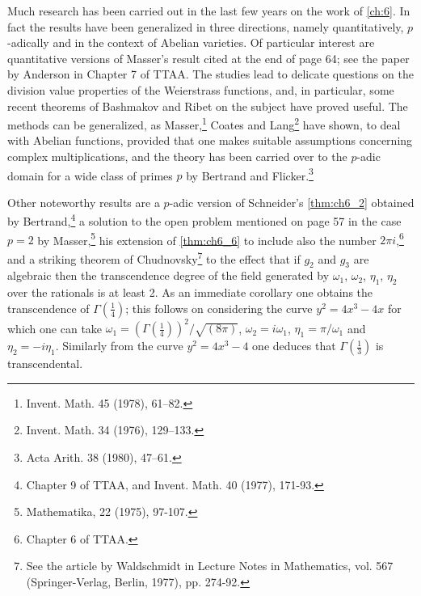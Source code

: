 Much research has been carried out in the last few years on the work of \autoref{ch:6}. In fact the results have been generalized in three directions, namely quantitatively, \(p\)-adically and in the context of Abelian varieties. Of particular interest are quantitative versions of Masser's result cited at the end of page 64; see the paper by Anderson in Chapter 7 of TTAA. The studies lead to delicate questions on the division value properties of the Weierstrass functions, and, in particular, some recent theorems of Bashmakov and Ribet on the subject have proved useful. The methods can be generalized, as Masser,\footnote{Invent. Math. 45 (1978), 61--82.} Coates and Lang\footnote{Invent. Math. 34 (1976), 129--133.} have shown, to deal with Abelian functions, provided that one makes suitable assumptions concerning complex multiplications, and the theory has been carried over to the \(p\)-adic domain for a wide class of primes \(p\) by Bertrand and Flicker.\footnote{Acta Arith. 38 (1980), 47--61.}

Other noteworthy results are a \(p\)-adic version of Schneider's \autoref{thm:ch6_2} obtained by Bertrand,\footnote{Chapter 9 of TTAA, and Invent. Math. 40 (1977), 171-93.} a solution to the open problem mentioned on page 57 in the case \(p=2\) by Masser,\footnote{Mathematika, 22 (1975), 97-107.} his extension of \autoref{thm:ch6_6} to include also the number \(2\pi i\),\footnote{Chapter 6 of TTAA.} and a striking theorem of Chudnovsky\footnote{See the article by Waldschmidt in Lecture Notes in Mathematics, vol. 567 (Springer-Verlag, Berlin, 1977), pp. 274-92.} to the effect that if \(g_2\) and \(g_3\) are algebraic then the transcendence degree of the field generated by \(\omega_1\), \(\omega_2\), \(\eta_1\), \(\eta_2\) over the rationals is at least 2. As an immediate corollary one obtains the transcendence of \(\Gamma(\frac{1}{4})\); this follows on considering the curve \(y^2 = 4x^3 - 4x\) for which one can take \(\omega_1 = (\Gamma(\frac{1}{4}))^2/\sqrt{(8\pi)}\), \(\omega_2 = i\omega_1\), \(\eta_1 = \pi/\omega_1\) and \(\eta_2 = -i\eta_1\). Similarly from the curve \(y^2 = 4x^3 - 4\) one deduces that \(\Gamma(\frac{1}{3})\) is transcendental.

